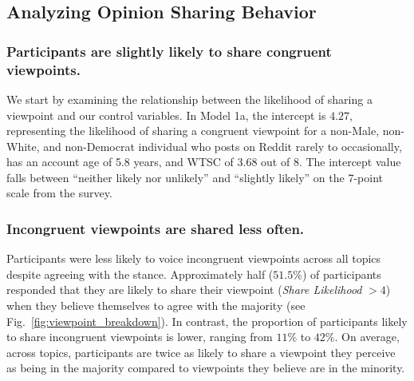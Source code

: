 \subsection{Analyzing Opinion Sharing Behavior}
\label{subsec:sharing}
\subsubsection{Participants are slightly likely to share congruent viewpoints.} We start by examining the relationship between the likelihood of sharing a viewpoint and our control variables. In Model 1a, the intercept is $4.27$, representing the likelihood of sharing a congruent viewpoint for a non-Male, non-White, and non-Democrat individual who posts on Reddit rarely to occasionally, has an account age of 5.8 years, and WTSC of 3.68 out of 8. The intercept value falls between ``neither likely nor unlikely'' and ``slightly likely'' on the 7-point scale from the survey. 

\subsubsection{Incongruent viewpoints are shared less often.}
Participants were less likely to voice incongruent viewpoints across all topics despite agreeing with the stance. Approximately half ($51.5\%$) of participants responded that they are likely to share their viewpoint (\textit{Share Likelihood} $> 4$) when they believe themselves to agree with the majority (see Fig.~\ref{fig:viewpoint_breakdown}). In contrast, the proportion of participants likely to share incongruent viewpoints is lower, ranging from $11\%$ to $42\%$. On average, across topics, participants are twice as likely to share a viewpoint they perceive as being in the majority compared to viewpoints they believe are in the minority.

